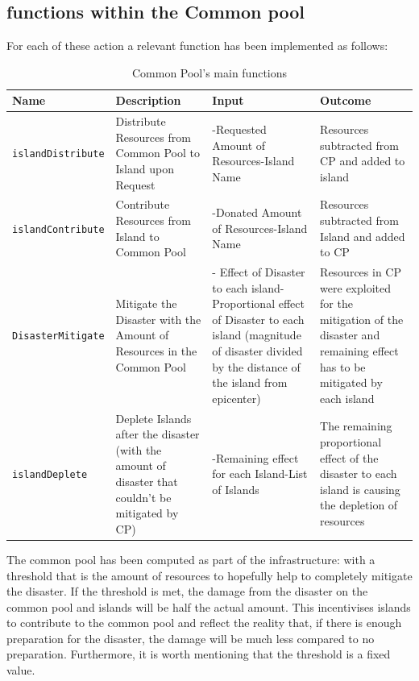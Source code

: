 \newpage
\subsection{functions within the Common pool}

For each of these action a relevant function has been implemented as follows:\\

\begin{table}[h]
\begin{center}
\begin{tabular}
{|p{1.1in}|p{1.1in}|p{1.1in}|p{1.1in}|} \hline
\textbf{Name} & \textbf{Description} & \textbf{Input} & \textbf{Outcome} \\ \hline
\texttt{islandDistribute} & Distribute Resources from Common Pool to Island upon Request & -Requested Amount of Resources\newline -Island Name & Resources subtracted from CP and added to island \\ \hline
\texttt{islandContribute} & Contribute Resources from Island to Common Pool & -Donated Amount of Resources\newline -Island Name & Resources subtracted from Island and added to CP \\ \hline
\texttt{DisasterMitigate} & Mitigate the Disaster with the Amount of Resources in the Common Pool & - Effect of Disaster to each island\newline - Proportional effect of Disaster to each island (magnitude of disaster divided by the distance of the island from epicenter) & Resources in CP were exploited for the mitigation of the disaster and remaining effect has to be mitigated by each island \\ \hline
\texttt{islandDeplete} & Deplete Islands after the disaster (with the amount of disaster that couldn't be mitigated by CP) & -Remaining effect for each Island\newline -List of Islands & The remaining proportional effect of the disaster to each island is causing the depletion of resources \\ \hline
\end{tabular}
\caption{\label{tab:table-name}Common Pool's main functions}
\end{center}
\end{table}

The common pool has been computed as part of the infrastructure: with a threshold that is the amount of resources to hopefully help to completely mitigate the disaster. If the threshold is met, the damage from the disaster on the common pool and islands will be half the actual amount. This incentivises islands to contribute to the common pool and reflect the reality that, if there is enough preparation for the disaster, the damage will be much less compared to no preparation. Furthermore, it is worth mentioning that the threshold is a fixed value.\\

